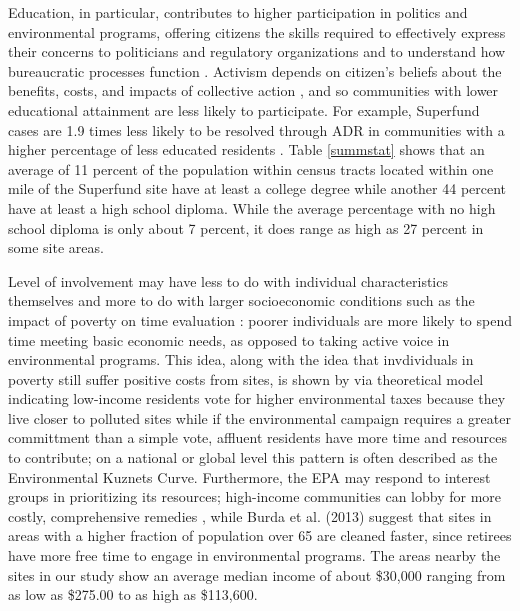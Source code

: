 \documentclass[12pt]{article}
\begin{document}
Education, in particular, contributes to higher participation in politics and environmental programs, offering citizens the skills required to effectively express their concerns to politicians and regulatory organizations \parencite{verba1995voice} and to understand how bureaucratic processes function \parencite{Howell1992, rosenstone1993mobilization}. Activism depends on citizen's beliefs about the benefits, costs, and impacts of collective action \parencite{finkel1989personal}, and so communities with lower educational attainment are less likely to participate. For example, Superfund cases are 1.9 times less likely to be resolved through ADR in communities with a higher percentage of less educated residents \parencite{Collins2008}. Table \ref{summstat} shows that an average of 11 percent of the population within census tracts located within one mile of the Superfund site have at least a college degree while another 44 percent have at least a high school diploma. While the average percentage with no high school diploma is only about 7 percent, it does range as high as 27 percent in some site areas. 

Level of involvement may have less to do with individual characteristics themselves and more to do with larger socioeconomic conditions such as the impact of poverty on time evaluation \parencite{dunlap1978new, Sigman2001}: poorer individuals are more likely to spend time meeting basic economic needs, as opposed to taking active voice in environmental programs. This idea, along with the idea that invdividuals in poverty still suffer positive costs from sites, is shown by \textcite{nakada_2017} via theoretical model indicating low-income residents vote for higher environmental taxes because they live closer to polluted sites while if the environmental campaign requires a greater committment than a simple vote, affluent residents have more time and resources to contribute; on a national or global level this pattern is often described as the Environmental Kuznets Curve. Furthermore, the EPA may respond to interest groups in prioritizing its resources; high-income communities can lobby for more costly, comprehensive remedies \parencite{Sigman2001, Gamper-Rabindran2013, burda2014environmental}, while {Burda et al. (2013) suggest that sites in areas with a higher fraction of population over 65 are cleaned faster, since retirees have more free time to engage in environmental programs.} The areas nearby the sites in our study show an average median income of about \$30,000 ranging from as low as \$275.00 to as high as \$113,600. 
\end{document}
